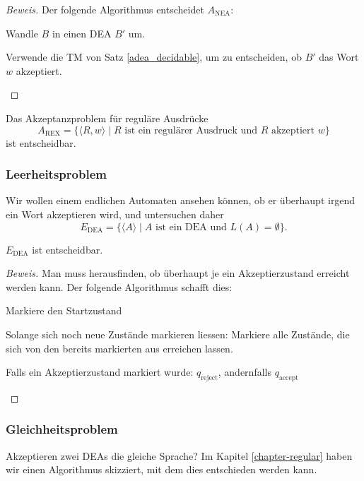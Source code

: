 \begin{proof}[Beweis]
Der folgende Algorithmus entscheidet 
$A_{\text{NEA}}$:
\medskip
\begin{compactenum}
\item Wandle $B$ in einen DEA $B'$ um.
\item Verwende die TM von Satz \ref{adea_decidable}, um zu
entscheiden, ob $B'$ das Wort $w$ akzeptiert.
\end{compactenum}
\medskip
\end{proof}

\begin{satz} Das Akzeptanzproblem für reguläre Ausdrücke
%
\[
A_{\text{REX}}=\{
\langle R,w\rangle\;|\;\text{$R$ ist ein regulärer Ausdruck und $R$ akzeptiert $w$}
\}
\]
%
ist entscheidbar.
\end{satz}

\subsubsection{Leerheitsproblem}
%
Wir wollen einem endlichen Automaten ansehen können, ob er überhaupt
irgend ein Wort akzeptieren wird, und untersuchen daher
\[
E_{\text{DEA}}
=\{
\langle A\rangle \;|\;\text{$A$  ist ein DEA und $L(A)=\emptyset$}
\}.
\]
\begin{satz}
$E_{\text{DEA}}$
%
ist entscheidbar.
\end{satz}

\begin{proof}[Beweis]
Man muss herausfinden, ob überhaupt je ein Akzeptierzustand erreicht
werden kann.
Der folgende Algorithmus schafft dies:
\medskip
\begin{compactenum}
\item Markiere den Startzustand
\item Solange sich noch neue Zustände markieren liessen:
 Markiere alle Zustände, die sich von den bereits markierten aus
erreichen lassen.
\item Falls ein Akzeptierzustand markiert wurde: $q_{\text{reject}}$,
andernfalls
$q_{\text{accept}}$
\end{compactenum}
\medskip
\end{proof}

\subsubsection{Gleichheitsproblem}
%
Akzeptieren zwei DEAs die gleiche Sprache? Im Kapitel \ref{chapter-regular}
haben wir einen Algorithmus skizziert, mit dem dies entschieden werden kann.

